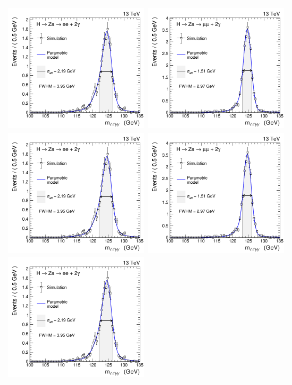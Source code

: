 \begin{figure}[htbp]
  \begin{center}
		\includegraphics[width=0.32\textwidth,page=1]{figures/chapter04/sig_model/sigModel_M30_ele.pdf}
        \includegraphics[width=0.32\textwidth,page=1]{figures/chapter04/sig_model/sigModel_M30_mu.pdf} \\
		\includegraphics[width=0.32\textwidth,page=2]{figures/chapter04/sig_model/sigModel_M30_ele.pdf}
		\includegraphics[width=0.32\textwidth,page=2]{figures/chapter04/sig_model/sigModel_M30_mu.pdf}\\
		\includegraphics[width=0.32\textwidth,page=3]{figures/chapter04/sig_model/sigModel_M30_ele.pdf}

\end{center}
\end{figure}

